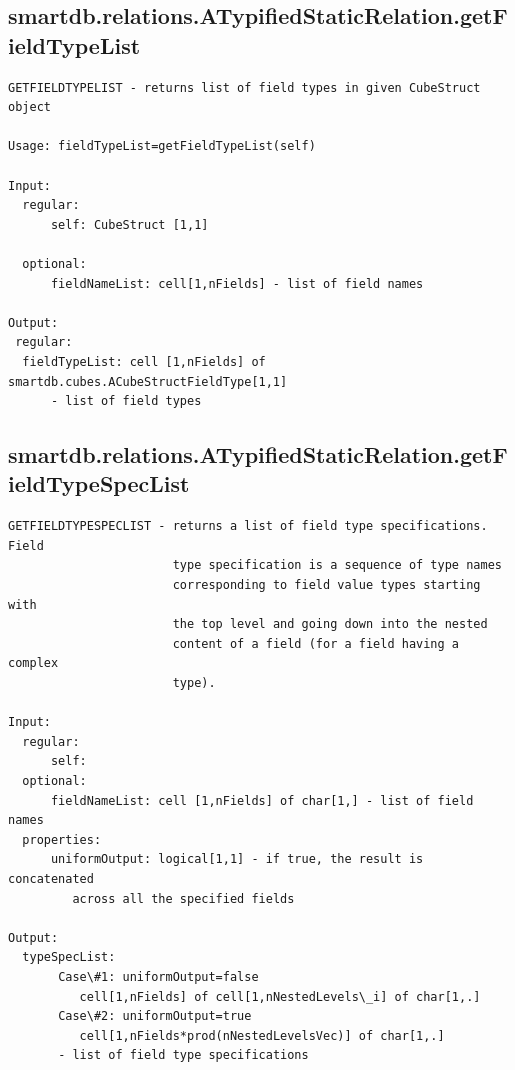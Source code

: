 \documentclass[letterpaper,10pt,english]{sphinxmanual}
\begin{document}
\subsection{smartdb.relations.ATypifiedStaticRelation.getFieldTypeList}
\label{chap_functions:smartdb-relations-atypifiedstaticrelation-getfieldtypelist}
\begin{Verbatim}[commandchars=\\\{\}]
GETFIELDTYPELIST - returns list of field types in given CubeStruct object

Usage: fieldTypeList=getFieldTypeList(self)

Input:
  regular:
      self: CubeStruct [1,1]

  optional:
      fieldNameList: cell[1,nFields] - list of field names

Output:
 regular:
  fieldTypeList: cell [1,nFields] of smartdb.cubes.ACubeStructFieldType[1,1]
      - list of field types
\end{Verbatim}


\subsection{smartdb.relations.ATypifiedStaticRelation.getFieldTypeSpecList}
\label{chap_functions:smartdb-relations-atypifiedstaticrelation-getfieldtypespeclist}
\begin{Verbatim}[commandchars=\\\{\}]
GETFIELDTYPESPECLIST - returns a list of field type specifications. Field
                       type specification is a sequence of type names
                       corresponding to field value types starting with
                       the top level and going down into the nested
                       content of a field (for a field having a complex
                       type).

Input:
  regular:
      self:
  optional:
      fieldNameList: cell [1,nFields] of char[1,] - list of field names
  properties:
      uniformOutput: logical[1,1] - if true, the result is concatenated
         across all the specified fields

Output:
  typeSpecList:
       Case\#1: uniformOutput=false
          cell[1,nFields] of cell[1,nNestedLevels\_i] of char[1,.]
       Case\#2: uniformOutput=true
          cell[1,nFields*prod(nNestedLevelsVec)] of char[1,.]
       - list of field type specifications
\end{Verbatim}
\end{document}

